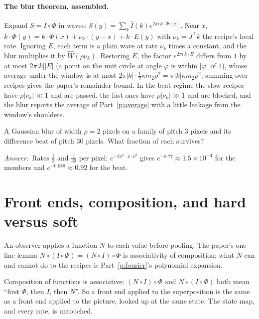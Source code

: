 \documentclass[10pt]{article}
\theoremstyle{plain}
\theoremstyle{definition}
\newcommand{\answer}{\par\smallskip\noindent\textit{Answer.}\ }
\begin{document}
\paragraph{The blur theorem, assembled.}
Expand $S=I\circ\Phi$ in waves: $S(y)=\sum_k\hat I(k)e^{2\pi i\,k\cdot\Phi(y)}$.
Near $x$, $k\cdot\Phi(y)=k\cdot\Phi(x)+\nu_k\cdot(y-x)+k\cdot E(y)$ with
$\nu_k=J^{\top}k$ the recipe's local rate. Ignoring $E$, each term is a plain
wave at rate $\nu_k$ times a constant, and the blur multiplies it by
$\widehat W(\rho\nu_k)$. Restoring $E$, the factor $e^{2\pi i\,k\cdot E}$
differs from $1$ by at most $2\pi|k||E|$ (a point on the unit circle at
angle $\varphi$ is within $|\varphi|$ of $1$), whose average under the window
is at most $2\pi|k|\cdot\tfrac12\kappa m_2\rho^2=\pi|k|\kappa m_2\rho^2$;
summing over recipes gives the paper's remainder bound. In the beat regime
the slow recipes have $\rho|\nu_k|\ll1$ and are passed, the fast ones have
$\rho|\nu_k|\gg1$ and are blocked, and the blur reports the average of
Part~\ref{p:average} with a little leakage from the window's shoulders.

\begin{checkyourself}
A Gaussian blur of width $\rho=2$ pixels on a family of pitch $3$ pixels
and its difference beat of pitch $30$ pixels. What fraction of each survives?
\answer Rates $\tfrac13$ and $\tfrac1{30}$ per pixel;
$e^{-2\pi^2\cdot4\cdot\nu^2}$ gives $e^{-8.77}\approx1.5\times10^{-4}$ for
the members and $e^{-0.088}\approx0.92$ for the beat.
\end{checkyourself}

\section{Front ends, composition, and hard versus soft}
\label{p:frontend}

\begin{why}
An observer applies a function $N$ to each value before pooling. The paper's
one-line lemma $N\circ(I\circ\Phi)=(N\circ I)\circ\Phi$ is associativity of
composition; what $N$ can and cannot do to the recipes is
Part~\ref{p:fourier}'s polynomial expansion.
\end{why}

Composition of functions is associative: $(N\circ I)\circ\Phi$ and
$N\circ(I\circ\Phi)$ both mean ``first $\Phi$, then $I$, then $N$''. So a
front end applied to the superposition is the same as a front end applied
to the picture, looked up at the same state. The state map, and every rate,
is untouched.
\end{document}
